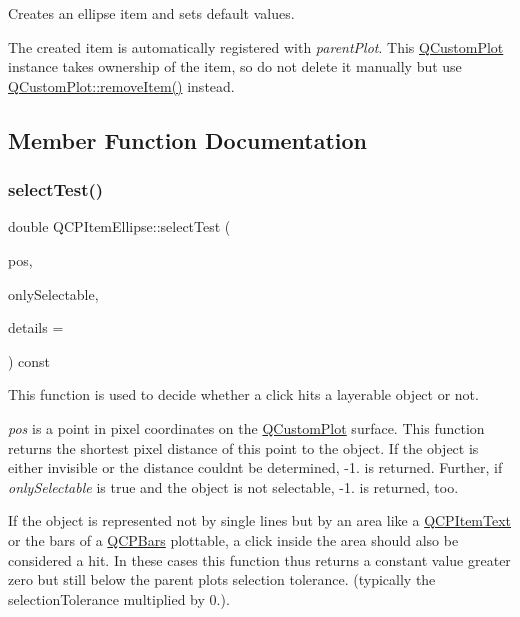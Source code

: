 Creates an ellipse item and sets default values.

The created item is automatically registered with {\itshape parent\+Plot}. This \hyperlink{class_q_custom_plot}{Q\+Custom\+Plot} instance takes ownership of the item, so do not delete it manually but use \hyperlink{class_q_custom_plot_ae04446557292551e8fb6e2c106e1848d}{Q\+Custom\+Plot\+::remove\+Item()} instead. 

\subsection{Member Function Documentation}
\mbox{\label{class_q_c_p_item_ellipse_ab6e2b8a29695c606c7731e498297ca29}} 
\subsubsection{\texorpdfstring{select\+Test()}{selectTest()}\hspace{0.1cm}{\footnotesize\ttfamily [1/2]}}
{\footnotesize\ttfamily double Q\+C\+P\+Item\+Ellipse\+::select\+Test (\begin{DoxyParamCaption}\item[{const Q\+PointF \&}]{pos,  }\item[{bool}]{only\+Selectable,  }\item[{Q\+Variant $\ast$}]{details = {} }\end{DoxyParamCaption}) const\hspace{0.3cm}{\ttfamily [virtual]}}

This function is used to decide whether a click hits a layerable object or not.

{\itshape pos} is a point in pixel coordinates on the \hyperlink{class_q_custom_plot}{Q\+Custom\+Plot} surface. This function returns the shortest pixel distance of this point to the object. If the object is either invisible or the distance couldn\textquotesingle{}t be determined, -\/1. is returned. Further, if {\itshape only\+Selectable} is true and the object is not selectable, -\/1. is returned, too.

If the object is represented not by single lines but by an area like a \hyperlink{class_q_c_p_item_text}{Q\+C\+P\+Item\+Text} or the bars of a \hyperlink{class_q_c_p_bars}{Q\+C\+P\+Bars} plottable, a click inside the area should also be considered a hit. In these cases this function thus returns a constant value greater zero but still below the parent plot\textquotesingle{}s selection tolerance. (typically the selection\+Tolerance multiplied by 0.).

